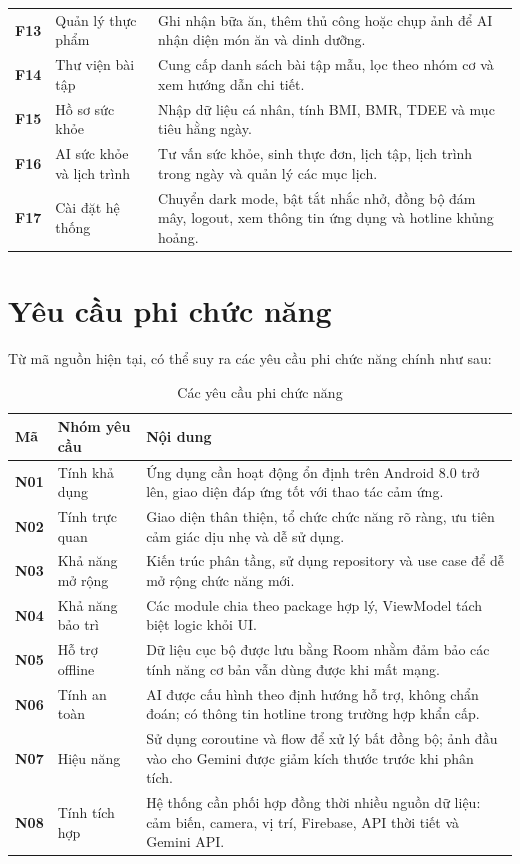 \documentclass{zenbuddy-report}
\begin{document}
\begin{longtable}{>{\bfseries}p{1.7cm}p{3.4cm}p{8.2cm}}
F13 & Quản lý thực phẩm & Ghi nhận bữa ăn, thêm thủ công hoặc chụp ảnh để AI nhận diện món ăn và dinh dưỡng. \\
F14 & Thư viện bài tập & Cung cấp danh sách bài tập mẫu, lọc theo nhóm cơ và xem hướng dẫn chi tiết. \\
F15 & Hồ sơ sức khỏe & Nhập dữ liệu cá nhân, tính BMI, BMR, TDEE và mục tiêu hằng ngày. \\
F16 & AI sức khỏe và lịch trình & Tư vấn sức khỏe, sinh thực đơn, lịch tập, lịch trình trong ngày và quản lý các mục lịch. \\
F17 & Cài đặt hệ thống & Chuyển dark mode, bật tắt nhắc nhở, đồng bộ đám mây, logout, xem thông tin ứng dụng và hotline khủng hoảng. \\
\bottomrule
\end{longtable}

\section{Yêu cầu phi chức năng}
Từ mã nguồn hiện tại, có thể suy ra các yêu cầu phi chức năng chính như sau:

\begin{table}[H]
\centering
\caption{Các yêu cầu phi chức năng}
\label{tab:non-functional}
\begin{tabularx}{\textwidth}{>{\bfseries}p{1.8cm}p{3.6cm}X}
\toprule
Mã & Nhóm yêu cầu & Nội dung \\
\midrule
N01 & Tính khả dụng & Ứng dụng cần hoạt động ổn định trên Android 8.0 trở lên, giao diện đáp ứng tốt với thao tác cảm ứng. \\
N02 & Tính trực quan & Giao diện thân thiện, tổ chức chức năng rõ ràng, ưu tiên cảm giác dịu nhẹ và dễ sử dụng. \\
N03 & Khả năng mở rộng & Kiến trúc phân tầng, sử dụng repository và use case để dễ mở rộng chức năng mới. \\
N04 & Khả năng bảo trì & Các module chia theo package hợp lý, ViewModel tách biệt logic khỏi UI. \\
N05 & Hỗ trợ offline & Dữ liệu cục bộ được lưu bằng Room nhằm đảm bảo các tính năng cơ bản vẫn dùng được khi mất mạng. \\
N06 & Tính an toàn & AI được cấu hình theo định hướng hỗ trợ, không chẩn đoán; có thông tin hotline trong trường hợp khẩn cấp. \\
N07 & Hiệu năng & Sử dụng coroutine và flow để xử lý bất đồng bộ; ảnh đầu vào cho Gemini được giảm kích thước trước khi phân tích. \\
N08 & Tính tích hợp & Hệ thống cần phối hợp đồng thời nhiều nguồn dữ liệu: cảm biến, camera, vị trí, Firebase, API thời tiết và Gemini API. \\
\bottomrule
\end{tabularx}
\end{table}
\end{document}
